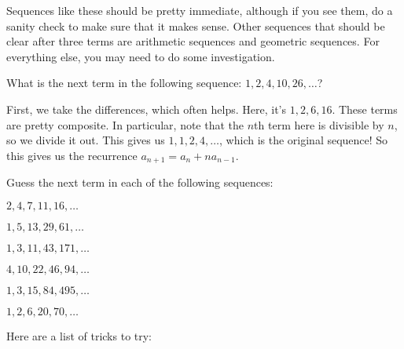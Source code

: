 \documentclass[11pt,paper=letter]{scrartcl}
\begin{document}
Sequences like these should be pretty immediate, although if you see them, do a sanity check to make sure that it makes sense. Other sequences that should be clear after three terms are arithmetic sequences and geometric sequences. For everything else, you may need to do some investigation.

\begin{exboxed}
  What is the next term in the following sequence: $1, 2, 4, 10, 26, \ldots$?
\end{exboxed}

First, we take the differences, which often helps. Here, it's $1, 2, 6, 16$. These terms are pretty composite. In particular, note that the $n$th term here is divisible by $n$, so we divide it out. This gives us $1, 1, 2, 4, \ldots$, which is the original sequence! So this gives us the recurrence $a_{n+1} = a_n + na_{n-1}$.

\begin{exrboxed}
  Guess the next term in each of the following sequences:
  \begin{itemthin}[itemsep=-0.2ex]
    \item $2, 4, 7, 11, 16, \ldots$
    \item $1, 5, 13, 29, 61, \ldots$
    \item $1, 3, 11, 43, 171, \ldots$
    \item $4, 10, 22, 46, 94, \ldots$
    \item $1, 3, 15, 84, 495, \ldots$
    \item $1, 2, 6, 20, 70, \ldots$
  \end{itemthin}
\end{exrboxed}

Here are a list of tricks to try:
\end{document}
